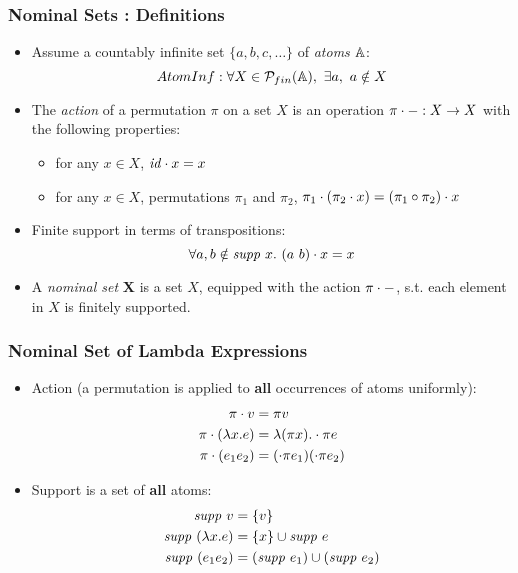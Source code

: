 \documentclass[10pt]{beamer}
\begin{document}
\begin{frame}
  \frametitle{Nominal Sets : Definitions}
  \begin{itemize}
  \item Assume a countably infinite set $\{a,b,c,\dots \}$ of \emph{atoms} $\mathbb{A}$:
    \[ AtomInf : \forall X \in \mathcal{P}_{fin}(\mathbb{A}),~\exists a,~a \notin X\]
  \item The \emph{action} of a permutation $\pi$ on a set $X$ is an operation
    $\pi \cdot -:  X -> X$ with the following properties:
    \begin{itemize}
    \item for any $x\in X$, $\mathit{id} \cdot x = x$
    \item for any $x\in X$, permutations $\pi_1$ and $\pi_2$, $\pi_1 \cdot (\pi_2 \cdot x) = (\pi_1 \circ \pi_2) \cdot x$
    \end{itemize}
  \item Finite support in terms of transpositions:
    \[ \forall a,b \notin \mathit{supp}~ x.~(a ~ b) \cdot x = x \]
  \item A \emph{nominal set} \textbf{X} is a set $X$, equipped with the action
    $\pi \cdot -$, s.t. each element in $X$ is finitely supported.
  \end{itemize}
\end{frame}

\begin{frame}
  \frametitle{Nominal Set of Lambda Expressions}
  \begin{itemize}
  \item Action (a permutation is applied to \textbf{all} occurrences of atoms uniformly):
    \begin{align*}
    \action \pi v &= \pi v\\
    \action \pi {(\lambda x.e)} &= \lambda (\pi x). \action \pi e\\
    \action \pi {(e_1 e_2)} &= (\action \pi {e_1}) (\action \pi {e_2})
    \end{align*}
  \item Support is a set of \textbf{all} atoms:
    \begin{align*}
    \mathit{supp}~ v &= \{v\}\\
    \mathit{supp}~ (\lambda x.e) &= \{x\} \cup \mathit{supp}~ e\\
    \mathit{supp}~ (e_1 e_2) & = (\mathit{supp}~ e_1) \cup (\mathit{supp}~ e_2)
  \end{align*}
  \end{itemize}
\end{frame}
\end{document}
